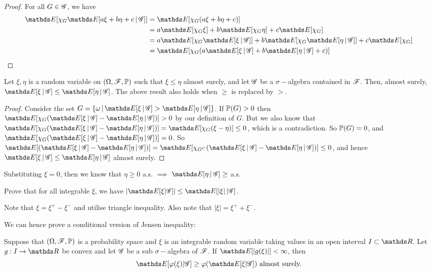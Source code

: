 \begin{proof}
For all $G \in \mathcal{G}$, we have
\begin{align*}
    \E[\chi_G \E[a\xi + b\eta + c \,|\, \G]] 
    &= \E[\chi_G (a\xi + b\eta + c)] \\
    &= a\E[\chi_G\xi] + b\E[\chi_G \eta] + c\E[\chi_G] \\
    &= a\E[\chi_G \E[\xi\,|\,\G]] + b\E[\chi_G \E[\eta\,|\,\G]] + c\E[\chi_G] \\
    &= \E[\chi_G (a\E[\xi \,|\, \G] + b \E[\eta \,|\, \G ] + c)]
\end{align*}
\end{proof}

\begin{property}[II. Monotonicity] \label{prop:conditional_expectation_monotonicity} 
Let $\xi, \eta$ is a random variable on $(\Omega, \mathcal{F}, \mathbb{P})$ such that $\xi \leq \eta$ almost surely, and let $\mathcal{G}$ be a $\sigma-$algebra contained in $\mathcal{F}$. Then, almost surely, $\E[\xi\,|\,\G] \leq \E[\eta \,|\, \G]$. The above result also holds when $\geq$ is replaced by $>$.
\end{property}

\begin{proof}
Consider the set $G = \set{\omega\,|\,\E[\xi\,|\,\G] > \E[\eta\,|\,\G]}$. If $\mathbb{P}(G) > 0$ then $\E[\chi_G (\E[\xi\,|\,\G] - \E[\eta\,|\,\G])] > 0$ by our definition of $G$. But we also know that $\E[\chi_G (\E[\xi\,|\,\G] - \E[\eta\,|\,\G])] = \E[\chi_G (\xi-\eta)] \leq 0$, which is a contradiction. So $\mathbb{P}(G) = 0$, and $\E[\chi_G (\E[\xi\,|\,\G] - \E[\eta\,|\,\G])] = 0$. So $\E[(\E[\xi\,|\,\G] - \E[\eta\,|\,\G])] = \E[\chi_{G^C} (\E[\xi\,|\,\G] - \E[\eta\,|\,\G])] \leq 0$, and hence $\E[\xi\,|\,\G] \leq \E[\eta\,|\,\G]$ almost surely.
\end{proof}

Substituting $\xi = 0$, then we know that $\eta \geq 0$ a.s. $\implies$ $\E[\eta\,|\,\G] \geq$ a.s.

\begin{exercise}
Prove that for all integrable $\xi$, we have $|\E[\xi|\G]| \leq \E[|\xi| \, | \G]$.
\end{exercise}

\begin{hint}
Note that $\xi = \xi^+ - \xi^-$ and utilise triangle inequality. Also note that $|\xi| = \xi^+ + \xi^-$.
\end{hint}

We can hence prove a conditional version of Jensen inequality:
\begin{theorem}
Suppose that $(\Omega, \mathcal{F},\mathbb{P})$ is a probability space and $\xi$ is an integrable random variable taking values in an open interval $I \subset \R$. Let $g: I \to \R$ be convex and let $\mathcal{G}$ be a sub $\sigma-$algebra of $\mathcal{F}$. If $\E[|g(\xi)|] < \infty$, then
\begin{equation} \label{eq:conditional_Jensen_ineq}
    \E[\varphi(\xi) | \G] \ge \varphi(\E[\xi | \G])  \text{ almost surely.}
\end{equation}
\end{theorem}


